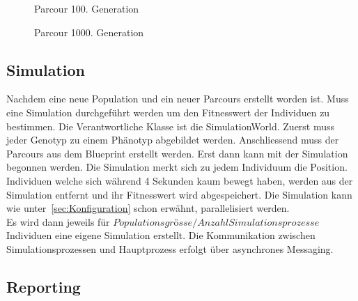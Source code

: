       \begin{figure}[H]
        \centering
        
        \caption{Parcour 100. Generation\label{fig:parcours2}}
      \end{figure}

      \begin{figure}[H]
        \centering
        
        \caption{Parcour 1000. Generation\label{fig:parcours3}}
      \end{figure}

      \subsection{Simulation\label{sec:simulation}}

      Nachdem eine neue Population und ein neuer Parcours erstellt worden ist.
      Muss eine Simulation durchgeführt werden um den Fitnesswert der Individuen zu bestimmen.
      Die Verantwortliche Klasse ist die SimulationWorld.
      Zuerst muss jeder Genotyp zu einem Phänotyp abgebildet werden.
      Anschliessend muss der Parcours aus dem Blueprint erstellt werden.
      Erst dann kann mit der Simulation begonnen werden.
      Die Simulation merkt sich zu jedem Individuum die Position.
      Individuen welche sich während 4 Sekunden kaum bewegt haben,
      werden aus der Simulation entfernt und ihr Fitnesswert wird abgespeichert.
      Die Simulation kann wie unter~\ref{sec:Konfiguration} schon erwähnt, parallelisiert werden. \\
      Es wird dann jeweils für \( Populationsgrösse / Anzahl Simulationsprozesse \) Individuen eine eigene Simulation erstellt.
      Die Kommunikation zwischen Simulationsprozessen und Hauptprozess erfolgt über asynchrones Messaging.

    \subsection{Reporting\label{subsec:Reporting}}

